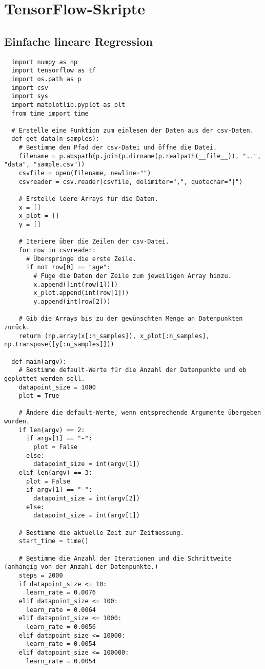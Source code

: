 \chapter{TensorFlow-Skripte}
\label{appendix:C}

\section{Einfache lineare Regression}
\label{appendix:C:1}

\begin{verbatim}
  import numpy as np
  import tensorflow as tf
  import os.path as p
  import csv
  import sys
  import matplotlib.pyplot as plt
  from time import time

  # Erstelle eine Funktion zum einlesen der Daten aus der csv-Daten.
  def get_data(n_samples):
    # Bestimme den Pfad der csv-Datei und öffne die Datei.
    filename = p.abspath(p.join(p.dirname(p.realpath(__file__)), "..", "data", "sample.csv"))
    csvfile = open(filename, newline="")
    csvreader = csv.reader(csvfile, delimiter=",", quotechar="|")

    # Erstelle leere Arrays für die Daten.
    x = []
    x_plot = []
    y = []

    # Iteriere über die Zeilen der csv-Datei.
    for row in csvreader:
      # Überspringe die erste Zeile.
      if not row[0] == "age":
        # Füge die Daten der Zeile zum jeweiligen Array hinzu.
        x.append([int(row[1])])
        x_plot.append(int(row[1]))
        y.append(int(row[2]))

    # Gib die Arrays bis zu der gewünschten Menge an Datenpunkten zurück.
    return (np.array(x[:n_samples]), x_plot[:n_samples], np.transpose([y[:n_samples]]))

  def main(argv):
    # Bestimme default-Werte für die Anzahl der Datenpunkte und ob geplottet werden soll.
    datapoint_size = 1000
    plot = True

    # Ändere die default-Werte, wenn entsprechende Argumente übergeben wurden.
    if len(argv) == 2:
      if argv[1] == "-":
        plot = False
      else:
        datapoint_size = int(argv[1])
    elif len(argv) == 3:
      plot = False
      if argv[1] == "-":
        datapoint_size = int(argv[2])
      else:
        datapoint_size = int(argv[1])

    # Bestimme die aktuelle Zeit zur Zeitmessung.
    start_time = time()

    # Bestimme die Anzahl der Iterationen und die Schrittweite (anhängig von der Anzahl der Datenpunkte.)
    steps = 2000
    if datapoint_size <= 10:
      learn_rate = 0.0076
    elif datapoint_size <= 100:
      learn_rate = 0.0064
    elif datapoint_size <= 1000:
      learn_rate = 0.0056
    elif datapoint_size <= 10000:
      learn_rate = 0.0054
    elif datapoint_size <= 100000:
      learn_rate = 0.0054


\end{verbatim}
